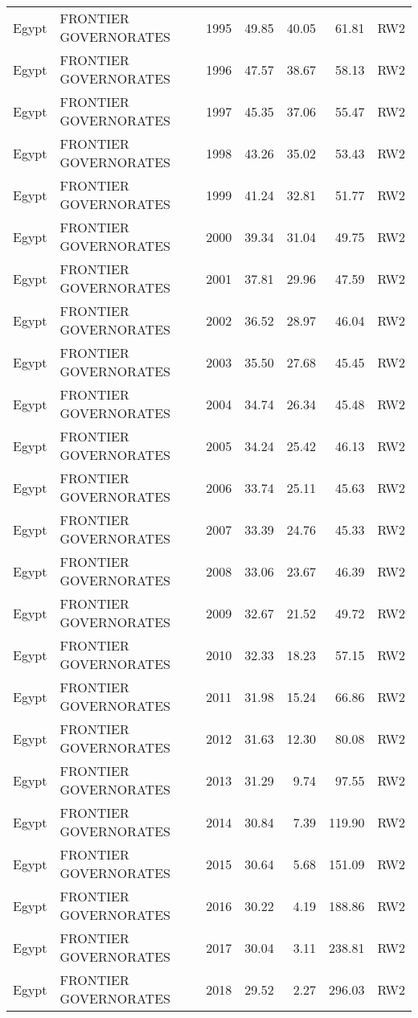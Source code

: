 \begin{longtable}{lllrrrl}
  Egypt & FRONTIER GOVERNORATES & 1995 & 49.85 & 40.05 & 61.81 & RW2 \\ 
  Egypt & FRONTIER GOVERNORATES & 1996 & 47.57 & 38.67 & 58.13 & RW2 \\ 
  Egypt & FRONTIER GOVERNORATES & 1997 & 45.35 & 37.06 & 55.47 & RW2 \\ 
  Egypt & FRONTIER GOVERNORATES & 1998 & 43.26 & 35.02 & 53.43 & RW2 \\ 
  Egypt & FRONTIER GOVERNORATES & 1999 & 41.24 & 32.81 & 51.77 & RW2 \\ 
  Egypt & FRONTIER GOVERNORATES & 2000 & 39.34 & 31.04 & 49.75 & RW2 \\ 
  Egypt & FRONTIER GOVERNORATES & 2001 & 37.81 & 29.96 & 47.59 & RW2 \\ 
  Egypt & FRONTIER GOVERNORATES & 2002 & 36.52 & 28.97 & 46.04 & RW2 \\ 
  Egypt & FRONTIER GOVERNORATES & 2003 & 35.50 & 27.68 & 45.45 & RW2 \\ 
  Egypt & FRONTIER GOVERNORATES & 2004 & 34.74 & 26.34 & 45.48 & RW2 \\ 
  Egypt & FRONTIER GOVERNORATES & 2005 & 34.24 & 25.42 & 46.13 & RW2 \\ 
  Egypt & FRONTIER GOVERNORATES & 2006 & 33.74 & 25.11 & 45.63 & RW2 \\ 
  Egypt & FRONTIER GOVERNORATES & 2007 & 33.39 & 24.76 & 45.33 & RW2 \\ 
  Egypt & FRONTIER GOVERNORATES & 2008 & 33.06 & 23.67 & 46.39 & RW2 \\ 
  Egypt & FRONTIER GOVERNORATES & 2009 & 32.67 & 21.52 & 49.72 & RW2 \\ 
  Egypt & FRONTIER GOVERNORATES & 2010 & 32.33 & 18.23 & 57.15 & RW2 \\ 
  Egypt & FRONTIER GOVERNORATES & 2011 & 31.98 & 15.24 & 66.86 & RW2 \\ 
  Egypt & FRONTIER GOVERNORATES & 2012 & 31.63 & 12.30 & 80.08 & RW2 \\ 
  Egypt & FRONTIER GOVERNORATES & 2013 & 31.29 & 9.74 & 97.55 & RW2 \\ 
  Egypt & FRONTIER GOVERNORATES & 2014 & 30.84 & 7.39 & 119.90 & RW2 \\ 
  Egypt & FRONTIER GOVERNORATES & 2015 & 30.64 & 5.68 & 151.09 & RW2 \\ 
  Egypt & FRONTIER GOVERNORATES & 2016 & 30.22 & 4.19 & 188.86 & RW2 \\ 
  Egypt & FRONTIER GOVERNORATES & 2017 & 30.04 & 3.11 & 238.81 & RW2 \\ 
  Egypt & FRONTIER GOVERNORATES & 2018 & 29.52 & 2.27 & 296.03 & RW2 \\ 

\end{longtable}
